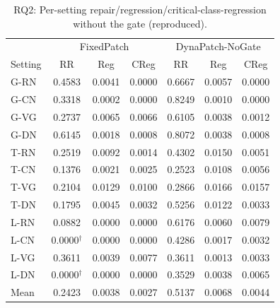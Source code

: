 \documentclass{article}
\begin{document}
\begin{table}[h]
\centering
\caption{RQ2: Per-setting repair/regression/critical-class-regression without the gate (reproduced).}
\label{tab:repro_rq2_ungated_persetting}
\footnotesize
\begin{tabular}{l ccc ccc}
\toprule
& \multicolumn{3}{c}{FixedPatch} & \multicolumn{3}{c}{DynaPatch-NoGate} \\
Setting & RR & Reg & CReg & RR & Reg & CReg \\
\midrule
G-RN & 0.4583 & 0.0041 & 0.0000 & 0.6667 & 0.0057 & 0.0000 \\
G-CN & 0.3318 & 0.0002 & 0.0000 & 0.8249 & 0.0010 & 0.0000 \\
G-VG & 0.2737 & 0.0065 & 0.0066 & 0.6105 & 0.0038 & 0.0012 \\
G-DN & 0.6145 & 0.0018 & 0.0008 & 0.8072 & 0.0038 & 0.0008 \\
T-RN & 0.2519 & 0.0092 & 0.0014 & 0.4302 & 0.0150 & 0.0051 \\
T-CN & 0.1376 & 0.0021 & 0.0025 & 0.2523 & 0.0108 & 0.0056 \\
T-VG & 0.2104 & 0.0129 & 0.0100 & 0.2866 & 0.0166 & 0.0157 \\
T-DN & 0.1795 & 0.0045 & 0.0032 & 0.5256 & 0.0122 & 0.0033 \\
L-RN & 0.0882 & 0.0000 & 0.0000 & 0.6176 & 0.0060 & 0.0079 \\
L-CN & 0.0000$^\dagger$ & 0.0000 & 0.0000 & 0.4286 & 0.0017 & 0.0032 \\
L-VG & 0.3611 & 0.0039 & 0.0077 & 0.3611 & 0.0013 & 0.0033 \\
L-DN & 0.0000$^\dagger$ & 0.0000 & 0.0000 & 0.3529 & 0.0038 & 0.0065 \\
\midrule
Mean & 0.2423 & 0.0038 & 0.0027 & 0.5137 & 0.0068 & 0.0044 \\
\bottomrule
\end{tabular}
\end{table}
\end{document}
